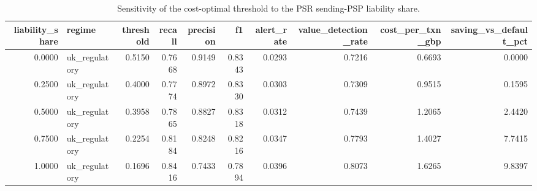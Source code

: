 \begin{table}
\caption{Sensitivity of the cost-optimal threshold to the PSR sending-PSP liability share.}
\label{tab:table9_sensitivity_liability_share}
\begin{tabular}{rlrrrrrrrr}
\toprule
liability\_share & regime & threshold & recall & precision & f1 & alert\_rate & value\_detection\_rate & cost\_per\_txn\_gbp & saving\_vs\_default\_pct \\
\midrule
0.0000 & uk\_regulatory & 0.5150 & 0.7668 & 0.9149 & 0.8343 & 0.0293 & 0.7216 & 0.6693 & 0.0000 \\
0.2500 & uk\_regulatory & 0.4000 & 0.7774 & 0.8972 & 0.8330 & 0.0303 & 0.7309 & 0.9515 & 0.1595 \\
0.5000 & uk\_regulatory & 0.3958 & 0.7865 & 0.8827 & 0.8318 & 0.0312 & 0.7439 & 1.2065 & 2.4420 \\
0.7500 & uk\_regulatory & 0.2254 & 0.8184 & 0.8248 & 0.8216 & 0.0347 & 0.7793 & 1.4027 & 7.7415 \\
1.0000 & uk\_regulatory & 0.1696 & 0.8416 & 0.7433 & 0.7894 & 0.0396 & 0.8073 & 1.6265 & 9.8397 \\
\bottomrule
\end{tabular}
\end{table}
